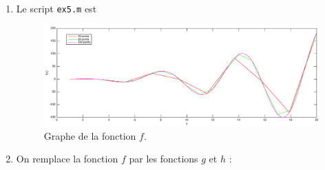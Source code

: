 \begin{enumerate}[label=\alph*)]
  \item Le script \texttt{ex5.m} est 
  
  
  
  \begin{figure}[h!]
    \centering
    \includegraphics[scale = 0.4]{s1/matlab/f5.eps}
    \caption{Graphe de la fonction $f$.}
    \label{fig:f5}
  \end{figure}

  
  \item On remplace la fonction $f$ par les fonctions $g$ et $h$ :
  
  
\end{enumerate}